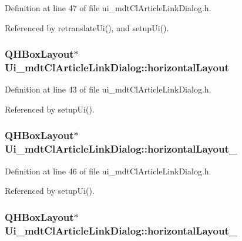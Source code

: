 Definition at line 47 of file ui\-\_\-mdt\-Cl\-Article\-Link\-Dialog.\-h.



Referenced by retranslate\-Ui(), and setup\-Ui().

\hypertarget{class_ui__mdt_cl_article_link_dialog_ab7765fc6d8bc959da371062c746615a6}{
\subsubsection[{horizontal\-Layout}]{\setlength{\rightskip}{0pt plus 5cm}Q\-H\-Box\-Layout$\ast$ Ui\-\_\-mdt\-Cl\-Article\-Link\-Dialog\-::horizontal\-Layout}}\label{class_ui__mdt_cl_article_link_dialog_ab7765fc6d8bc959da371062c746615a6}


Definition at line 43 of file ui\-\_\-mdt\-Cl\-Article\-Link\-Dialog.\-h.



Referenced by setup\-Ui().

\hypertarget{class_ui__mdt_cl_article_link_dialog_a72a6761ddd35e94d8e77d3eb931aba48}{
\subsubsection[{horizontal\-Layout\-\_\-2}]{\setlength{\rightskip}{0pt plus 5cm}Q\-H\-Box\-Layout$\ast$ Ui\-\_\-mdt\-Cl\-Article\-Link\-Dialog\-::horizontal\-Layout\-\_}}\label{class_ui__mdt_cl_article_link_dialog_a72a6761ddd35e94d8e77d3eb931aba48}


Definition at line 46 of file ui\-\_\-mdt\-Cl\-Article\-Link\-Dialog.\-h.



Referenced by setup\-Ui().

\hypertarget{class_ui__mdt_cl_article_link_dialog_ac7e0a1beaacbe3389d1c4e5ecd4883a9}{
\subsubsection[{horizontal\-Layout\-\_\-3}]{\setlength{\rightskip}{0pt plus 5cm}Q\-H\-Box\-Layout$\ast$ Ui\-\_\-mdt\-Cl\-Article\-Link\-Dialog\-::horizontal\-Layout\-\_}}\label{class_ui__mdt_cl_article_link_dialog_ac7e0a1beaacbe3389d1c4e5ecd4883a9}


